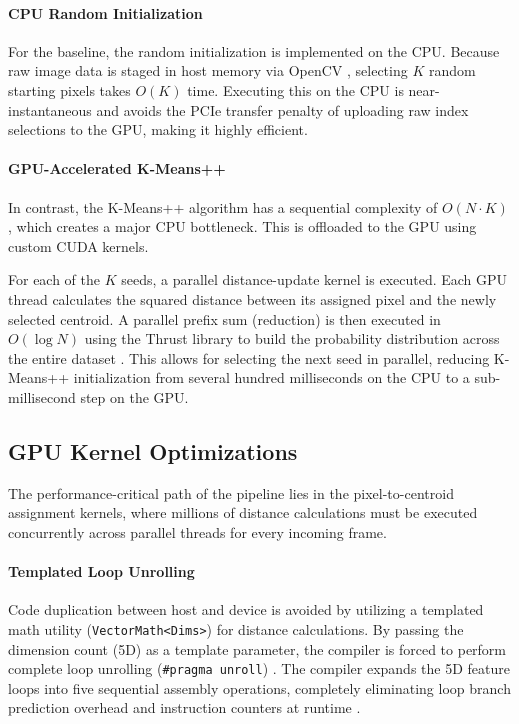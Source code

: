\paragraph{CPU Random Initialization}
For the baseline, the random initialization is implemented on the CPU. Because raw image data is staged in host memory via OpenCV \cite{Bradski2000}, selecting $K$ random starting pixels takes $O(K)$ time. Executing this on the CPU is near-instantaneous and avoids the PCIe transfer penalty of uploading raw index selections to the GPU, making it highly efficient.

\paragraph{GPU-Accelerated K-Means++}
In contrast, the K-Means++ algorithm has a sequential complexity of $O(N \cdot K)$ \cite{arthur2007k}, which creates a major CPU bottleneck. This is offloaded to the GPU using custom CUDA kernels. 

For each of the $K$ seeds, a parallel distance-update kernel is executed. Each GPU thread calculates the squared distance between its assigned pixel and the newly selected centroid. A parallel prefix sum (reduction) is then executed in $O(\log N)$ using the Thrust library to build the probability distribution across the entire dataset \cite{bell2012thrust}. This allows for selecting the next seed in parallel, reducing K-Means++ initialization from several hundred milliseconds on the CPU to a sub-millisecond step on the GPU.


\subsection{GPU Kernel Optimizations}
The performance-critical path of the pipeline lies in the pixel-to-centroid assignment kernels, where millions of distance calculations must be executed concurrently across parallel threads for every incoming frame.

\paragraph{Templated Loop Unrolling}
Code duplication between host and device is avoided by utilizing a templated math utility (\texttt{VectorMath<Dims>}) for distance calculations. By passing the dimension count (5D) as a template parameter, the compiler is forced to perform complete loop unrolling (\texttt{\#pragma unroll}) \cite{CudaGuide}. The compiler expands the 5D feature loops into five sequential assembly operations, completely eliminating loop branch prediction overhead and instruction counters at runtime \cite{stroustrup2022tour, cook2012cuda}.

